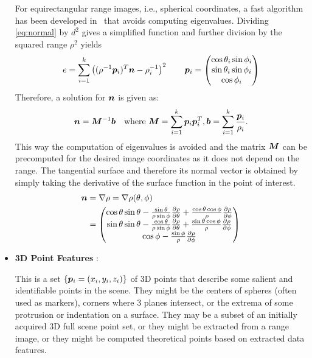 \documentclass[twocolumn,oneside]{book}
\newcommand{\V}[1]{\vector{#1}}  %
\newcommand{\M}[1]{\V{#1}}    %
\begin{document}
\begin{itemize}
  For equirectangular range images, i.e., spherical coordinates, a
  fast algorithm has been developed in~\cite{Badino_2011} that avoids
  computing eigenvalues. Dividing \eqref{eq:normal} by $d^2$ gives a
  simplified function and further division by the squared range
  $\rho^2$ yields
\begin{align*}
  e = \sum_{i=1}^k \left( (\rho^{-1}\V p_i)^T \V n - \rho_i^{-1}\right)^2
  \qquad
  \V p_i =
  \begin{pmatrix}
    \cos \theta_i \sin \phi_i\\
    \sin \theta_i \sin \phi_i\\
    \cos \phi_i
  \end{pmatrix}
\end{align*}  
  Therefore, a solution for $\V n$ is given as:
\begin{align*}
  \V n = \M M^{-1} \V b \quad \text{where} \ \M M = \sum_{i=1}^{k}\V p_i \V p_i^T,
  \V b = \sum_{i=1}^{k} \frac{\V p_i}{\rho_i}.
\end{align*}
  This way the computation of eigenvalues is avoided and the matrix
  $\M M$ can be precomputed for the desired image coordinates as it
  does not depend on the range. The tangential surface and therefore
  its normal vector is obtained by simply taking the derivative of
  the surface function in the point of interest.
\begin{align*}
  \V n
  & = \nabla \rho = \nabla \rho(\theta,\phi)\\
  & = \begin{pmatrix}
    \cos \theta \sin \theta
    - \frac{\sin \theta}{\rho \sin \phi} \frac{\partial \rho}{\partial \theta}
    + \frac{\cos \theta \cos \phi}{\rho} \frac{\partial \rho}{\partial \phi}\\
    \sin \theta \sin \theta
    - \frac{\cos \theta}{\rho \sin \phi} \frac{\partial \rho}{\partial \theta}
    + \frac{\sin \theta \cos \phi}{\rho} \frac{\partial \rho}{\partial \phi}\\
    \cos \phi - \frac{\sin \phi}{\rho} \frac{\partial \rho}{\partial \phi}
    \end{pmatrix}
\end{align*}

  
\item {\bf 3D Point Features }:

  This is a set $\{ \V p_i = (x_i,y_i,z_i)\}$ of 3D points that
  describe some salient and identifiable points in the scene. They
  might be the centers of spheres (often used as markers), corners
  where 3 planes intersect, or the extrema of some protrusion or
  indentation on a surface.  They may be a subset of an initially
  acquired 3D full scene point set, or they might be extracted from a
  range image, or they might be computed theoretical points based on
  extracted data features.


\end{itemize}
\end{document}
